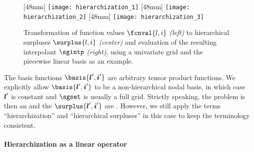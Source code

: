 \begin{figure}
  [48mm]{%
    \texttt{[image: hierarchization\_1]}%
  }%
  \hfill%
  [48mm]{%
    \texttt{[image: hierarchization\_2]}%
  }%
  \hfill%
  [48mm]{%
    \texttt{[image: hierarchization\_3]}%
  }%
  \caption[%
    Hierarchization of function values and evaluation of interpolant%
  ]{%
    Transformation of function values $\fcnval{l,i}$ \emph{(left)}
    to hierarchical surpluses $\surplus{l,i}$ \emph{(center)} and
    evaluation of the resulting interpolant $\sgintp$ \emph{(right)},
    using a univariate grid and the piecewise linear basis as an example.%
  }%
  \label{fig:hierarchization}%
\end{figure}

The basis functions $\basis{\*l',\*i'}$ are
arbitrary tensor product functions.
We explicitly allow $\basis{\*l',\*i'}$ to be a non-hierarchical
nodal basis, in which case ${\boldsymbol{l}}'$ is constant and
$\sgset$ is usually a full grid.
Strictly speaking, the problem is then an 
and the $\surplus{\*l',\*i'}$ are .
However, we still apply the terms
``hierarchization'' and ``hierarchical surpluses'' in this case
to keep the terminology consistent.

\paragraph{Hierarchization as a linear operator}

